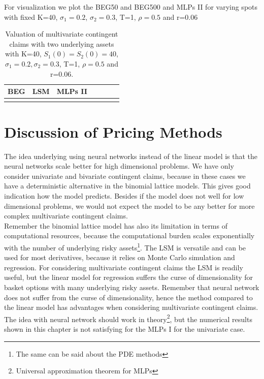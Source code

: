 For visualization we plot the BEG50 and BEG500 and MLPs II for varying spots with fixed K=40, $\sigma_1=0.2$, $\sigma_2=0.3$, T=1, $\rho=0.5$  and r=0.06

\begin{table}[th]
\caption{Valuation of multivariate contingent claims with two underlying assets with K=40, $S_1(0)=S_2(0)=40$, $\sigma_1=0.2, \sigma_2=0.3$, T=1, $\rho=0.5$  and r=0.06.}
\label{tab:PriceAmericanPut}
\centering
\begin{tabular}{l l l l l l l }
\toprule
\textbf{BEG} & \textbf{LSM} & \textbf{MLPs II} \\
\midrule
\bottomrule\\
\end{tabular}
\end{table}

\section{Discussion of Pricing Methods}
The idea underlying using neural networks instead of the linear model is that the neural networks scale better for high dimensional problems. We have only consider univariate and bivariate contingent claims, because in these cases we have a deterministic alternative in the binomial lattice models. This gives good indication how the model predicts. Besides if the model does not well for low dimensional problems, we would not expect the model to be any better for more complex multivariate contingent claims.\\

Remember the binomial lattice model has also its limitation in terms of computational resources, because the computational burden scales exponentially with the number of underlying risky assets\footnote{The same can be said about the PDE methods}. The LSM is versatile and can be used for most derivatives, because it relies on Monte Carlo simulation and regression. For considering multivariate contingent claims the LSM is readily useful, but the linear model for regression suffers the curse of dimensionality for basket options with many underlying risky assets. Remember that neural network does not suffer from the curse of dimensionality, hence the method compared to the linear model has advantages when considering multivariate contingent claims. The idea with neural network should work in theory\footnote{Universal approximation theorem for MLPs}, but the numerical results shown in this chapter is not satisfying for the MLPs I for the univariate case.\\

